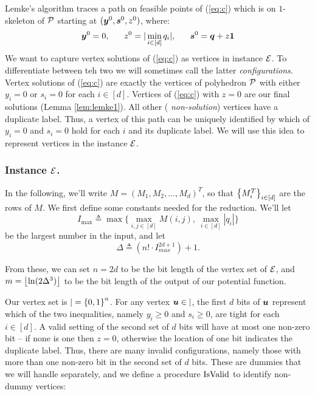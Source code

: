 Lemke's algorithm traces a path on feasible points of (\ref{eq:c}) which is on
$1$-skeleton of $\mbox{${\mathcal P}$}$ starting at $(\mbox{\boldmath $y$}^0,\mbox{\boldmath $s$}^0,z^0)$, where:
\begin{equation}\label{eq:v0}
\yy^0=0,\ \ \ \ \ z^0= |\min_{i \in [d]} q_i|,\ \ \ \ \  \ps^0=\qq+z\ones
\end{equation}
We want to capture
vertex solutions of (\ref{eq:c}) as vertices in \EOPL instance $\mbox{${\mathcal E}$}$. To
differentiate between teh two we will sometimes call the latter {\em configurations}. Vertex
solutions of (\ref{eq:c}) are exactly the vertices of polyhedron $\mbox{${\mathcal P}$}$ with
either $y_i=0$ or $s_i=0$ for each $i\in [d]$. Vertices of (\ref{eq:c}) with
$z=0$ are our final solutions (Lemma \ref{lem:lemke1}). All other ({\em
non-solution}) vertices have a duplicate label. Thus, a vertex of this path can be
uniquely identified by which of $y_i=0$ and $s_i=0$ hold for each $i$ and its
duplicate label. We will use this idea to represent vertices in the \EOPL
instance $\mbox{${\mathcal E}$}$. 

\subsubsection{\bf \EOPL Instance $\mbox{${\mathcal E}$}$.}

In the following, we'll write $M = (M_1, M_2, \dotsc, M_d)^T$, so that $\left\{ M^T_i \right\}_{i\in [d]}$ are the rows of $M$.
We first define some constants needed for the reduction. We'll let 
\[ I_{\max} \triangleq \max\{\max_{i,j\in [d]} M(i,j),\ \max_{i\in [d]} |q_i|\} \] be the largest number in the input, and let 
\[\Delta \triangleq (n! \cdot I_{max}^{2d+1})+1\text{.} \]

From these, we can set $n= 2d$ to be the bit length of the vertex set of $\mbox{${\mathcal E}$}$, and $m=\left\lfloor \ln(2\Delta^3) \right\rfloor$ to be the bit length of the output of our potential function.

Our vertex set is $\vert = \left\{ 0,1 \right\}^n$. For any vertex $\mbox{\boldmath $u$}\in \vert$, the first $d$ bits of $\mbox{\boldmath $u$}$ represent
which of the two inequalities, namely $y_i\ge 0$ and $s_i\ge 0$, are tight for
each $i \in [d]$. A valid setting of the second set of $d$ bits will have 
at most one non-zero bit -- if none is one then $z=0$, otherwise the location of one bit indicates the duplicate label. 
Thus, there are many invalid configurations, namely
those with more than one non-zero bit in the second set of $d$ bits. 
These are dummies that we will handle separately, and we define a procedure 
$\mbox{IsValid}$ to identify non-dummy vertices:

